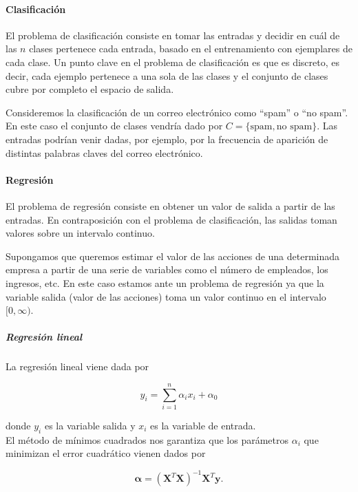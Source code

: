 \paragraph{Clasificación}
El problema de clasificación consiste en tomar las entradas y decidir en cuál de las $n$ clases pertenece cada entrada, basado en el entrenamiento con ejemplares de cada clase. Un punto clave en el problema de clasificación es que es discreto, es decir, cada ejemplo pertenece a una sola de las clases y el conjunto de clases cubre por completo el espacio de salida.

\begin{ejemplo}
Consideremos la clasificación de un correo electrónico como ``spam'' o ``no spam''. En este caso el conjunto de clases vendría dado por $C = \{ \text{spam}, \text{no spam} \}$. Las entradas podrían venir dadas, por ejemplo, por la frecuencia de aparición de distintas palabras claves del correo electrónico. 
\end{ejemplo}

\paragraph{Regresión}
El problema de regresión consiste en obtener un valor de salida a partir de las entradas. En contraposición con el problema de clasificación, las salidas toman valores sobre un intervalo continuo.

\begin{ejemplo}
Supongamos que queremos estimar el valor de las acciones de una determinada empresa a partir de una serie de variables como el número de empleados, los ingresos, etc. En este caso estamos ante un problema de regresión ya que la variable salida (valor de las acciones) toma un valor continuo en el intervalo $[0,\infty)$.  
\end{ejemplo}

\subparagraph{Regresión lineal}
La regresión lineal viene dada por

\begin{equation}
y_i = \sum_{i=1}^{n} \alpha_i x_i + \alpha_0
\end{equation}

donde $y_i$ es la variable salida y $x_i$ es la variable de entrada.\\

El método de mínimos cuadrados nos garantiza que los parámetros $\alpha_i$ que minimizan el error cuadrático vienen dados por

\begin{equation}
\mathbf{\alpha} = (\mathbf{X}^T \mathbf{X})^{-1} \mathbf{X}^T \mathbf{y}.
\end{equation}

